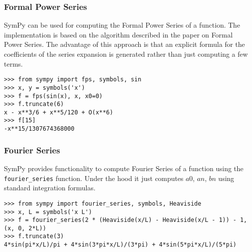 \subsubsection{Formal Power Series}

SymPy can be used for computing the Formal Power Series of a function.
The implementation is based on the algorithm described in the paper on Formal Power Series\cite{Gruntz93formalpower}.
The advantage of this approach is that an explicit formula for the coefficients
of the series expansion is generated rather than just computing a few terms.

\begin{verbatim}
>>> from sympy import fps, symbols, sin
>>> x, y = symbols('x')
>>> f = fps(sin(x), x, x0=0)
>>> f.truncate(6)
x - x**3/6 + x**5/120 + O(x**6)
>>> f[15]
-x**15/1307674368000
\end{verbatim}

\subsubsection{Fourier Series}

SymPy provides functionality to compute Fourier Series of a function using
the \texttt{fourier\_series} function. Under the hood it just computes $a0$, $an$, $bn$ using
standard integration formulas.

\begin{verbatim}
>>> from sympy import fourier_series, symbols, Heaviside
>>> x, L = symbols('x L')
>>> f = fourier_series(2 * (Heaviside(x/L) - Heaviside(x/L - 1)) - 1, (x, 0, 2*L))
>>> f.truncate(3)
4*sin(pi*x/L)/pi + 4*sin(3*pi*x/L)/(3*pi) + 4*sin(5*pi*x/L)/(5*pi)
\end{verbatim}
